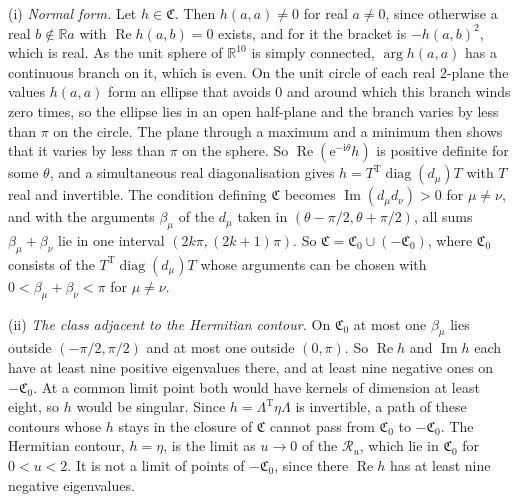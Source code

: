 (i) \emph{Normal form.} Let \(h\in\mathfrak C\). Then \(h(a,a)\neq0\) for real \(a\neq0\), since otherwise a real \(b\notin\mathbb Ra\) with \(\operatorname{Re}h(a,b)=0\) exists, and for it the bracket is \(-h(a,b)^2\), which is real. As the unit sphere of \(\mathbb R^{10}\) is simply connected, \(\arg h(a,a)\) has a continuous branch on it, which is even. On the unit circle of each real 2-plane the values \(h(a,a)\) form an ellipse that avoids \(0\) and around which this branch winds zero times, so the ellipse lies in an open half-plane and the branch varies by less than \(\pi\) on the circle. The plane through a maximum and a minimum then shows that it varies by less than \(\pi\) on the sphere. So \(\operatorname{Re}(\mathrm e^{-\mathrm i\theta}h)\) is positive definite for some \(\theta\), and a simultaneous real diagonalisation gives \(h=T^{\mathrm T}\operatorname{diag}(d_\mu)T\) with \(T\) real and invertible. The condition defining \(\mathfrak C\) becomes \(\operatorname{Im}(d_\mu d_\nu)>0\) for \(\mu\neq\nu\), and with the arguments \(\beta_\mu\) of the \(d_\mu\) taken in \((\theta-\pi/2,\theta+\pi/2)\), all sums \(\beta_\mu+\beta_\nu\) lie in one interval \((2k\pi,(2k+1)\pi)\). So \(\mathfrak C=\mathfrak C_0\cup(-\mathfrak C_0)\), where \(\mathfrak C_0\) consists of the \(T^{\mathrm T}\operatorname{diag}(d_\mu)T\) whose arguments can be chosen with \(0<\beta_\mu+\beta_\nu<\pi\) for \(\mu\neq\nu\).

(ii) \emph{The class adjacent to the Hermitian contour.} On \(\mathfrak C_0\) at most one \(\beta_\mu\) lies outside \((-\pi/2,\pi/2)\) and at most one outside \((0,\pi)\). So \(\operatorname{Re}h\) and \(\operatorname{Im}h\) each have at least nine positive eigenvalues there, and at least nine negative ones on \(-\mathfrak C_0\). At a common limit point both would have kernels of dimension at least eight, so \(h\) would be singular. Since \(h=\Lambda^{\mathrm T}\eta\Lambda\) is invertible, a path of these contours whose \(h\) stays in the closure of \(\mathfrak C\) cannot pass from \(\mathfrak C_0\) to \(-\mathfrak C_0\). The Hermitian contour, \(h=\eta\), is the limit as \(u\to0\) of the \(\mathcal R_u\), which lie in \(\mathfrak C_0\) for \(0<u<2\). It is not a limit of points of \(-\mathfrak C_0\), since there \(\operatorname{Re}h\) has at least nine negative eigenvalues.

